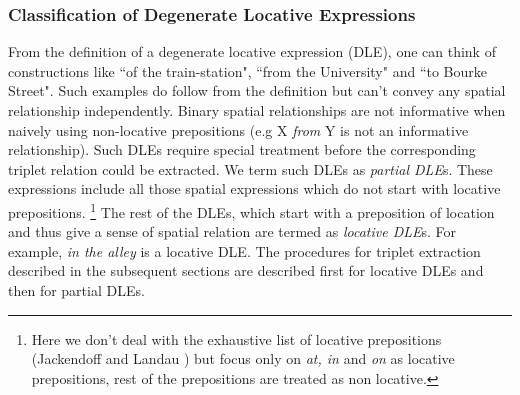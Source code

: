 \documentclass{acm_proc_article-sp}
\begin{document}
\subsubsection*{Classification of Degenerate Locative Expressions}
From the definition of a degenerate locative expression (DLE), one can think of constructions like ``of the train-station", ``from the University" and ``to Bourke Street". Such examples do follow from the definition but can't convey any spatial relationship independently. Binary spatial relationships are not informative when naively using non-locative prepositions (e.g X \textit{from} Y is not an informative relationship). Such DLEs require special treatment before the corresponding triplet relation could be extracted. We term such DLEs as \textit{partial DLE}s. These expressions include all those spatial expressions which do not start with locative prepositions. \footnote{Here we don't deal with the exhaustive list of locative prepositions (Jackendoff and Landau \cite{landau:and}) but focus only on \textit{at, in} and \textit{on} as locative prepositions, rest of the prepositions are treated as non locative.}
The rest of the DLEs, which start with a preposition of location and thus give a sense of spatial relation are termed as \textit{locative DLE}s. For example, \textit{in the alley} is a locative DLE. The procedures for triplet extraction described in the subsequent sections are described first for locative DLEs and then for partial DLEs. 
\end{document}
